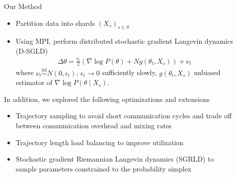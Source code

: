 \documentclass[final]{beamer}
\newlength{\sepwid}
\newlength{\onecolwid}
\newlength{\twocolwid}
\begin{document}
\begin{frame}[t]
\begin{columns}[t]
\begin{column}{\onecolwid}
\begin{block}{Our Method}
  \begin{itemize}
    \item Partition data into shards $(X_s)_{s \in S}$
    \item Using MPI, perform distributed stochastic gradient Langevin dynamics (D-SGLD) \cite{ahn2014distributed}
      \begin{align}
        \Delta \theta = \frac{\epsilon_t}{2}\left( \nabla \log P(\theta) + N g(\theta_t, X_s) \right) + \nu_t
      \end{align}
      where $\nu_t \overset{\text{iid}}{\sim} N(0, \epsilon_t)$, $\epsilon_t \to 0$ sufficiently slowly,
      $g(\theta_t, X_s)$ unbiased estimator of $\nabla \log P(\theta \mid X_s)$.
  \end{itemize}

  In addition, we explored the following optimizations and extensions
  \begin{itemize}
    \item Trajectory sampling to avoid short communication cycles and
      trade off between communication overhead and mixing rates \citep{ahn2014distributed}
    \item Trajectory length load balancing to improve utilization \citep{ahn2014distributed}
    \item Stochastic gradient Riemannian Langevin dynamics (SGRLD) to sample
      parameters constrained to the probability simplex \cite{patterson2013stochastic}
  \end{itemize}


\end{block}




\end{column} %

\begin{column}{\sepwid}\end{column} %

\begin{column}{\twocolwid} %


\end{column}
\end{columns}
\end{frame}
\end{document}
